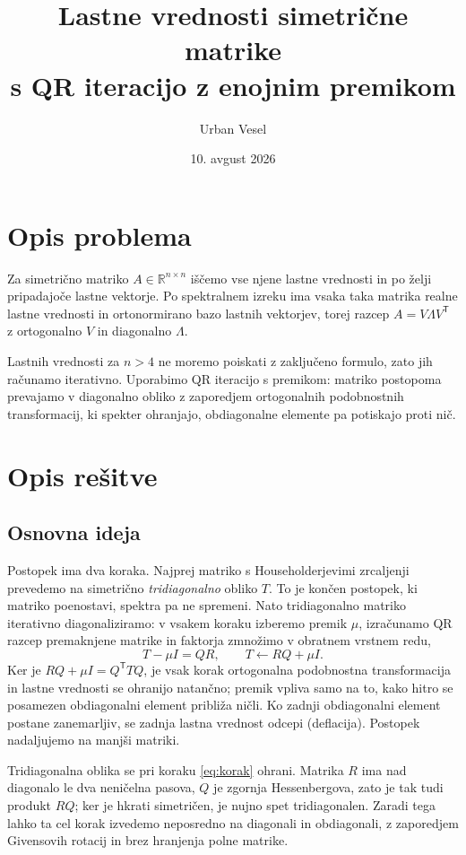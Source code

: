 \documentclass[11pt,a4paper]{article}
\title{Lastne vrednosti simetrične matrike\\ s QR iteracijo z enojnim premikom}
\author{Urban Vesel}
\date{10. avgust 2026}
\begin{document}
\maketitle
 
\section{Opis problema}
 
Za simetrično matriko $A \in \mathbb{R}^{n\times n}$ iščemo vse njene lastne
vrednosti in po želji pripadajoče lastne vektorje. Po spektralnem izreku ima
vsaka taka matrika realne lastne vrednosti in ortonormirano bazo lastnih
vektorjev, torej razcep $A = V\Lambda V^{\mathsf T}$ z ortogonalno $V$ in
diagonalno $\Lambda$.
 
Lastnih vrednosti za $n > 4$ ne moremo poiskati z zaključeno formulo, zato jih
računamo iterativno. Uporabimo QR iteracijo s premikom: matriko postopoma
prevajamo v diagonalno obliko z zaporedjem ortogonalnih podobnostnih
transformacij, ki spekter ohranjajo, obdiagonalne elemente pa potiskajo
proti nič.
 
\section{Opis rešitve}
 
\subsection{Osnovna ideja}
 
Postopek ima dva koraka. Najprej matriko s Householderjevimi zrcaljenji
prevedemo na simetrično \emph{tridiagonalno} obliko $T$. To je končen
postopek, ki matriko poenostavi, spektra pa ne spremeni. Nato tridiagonalno
matriko iterativno diagonaliziramo: v vsakem koraku izberemo premik $\mu$,
izračunamo QR razcep premaknjene matrike in faktorja zmnožimo v obratnem
vrstnem redu,
\begin{equation}
  T - \mu I = QR, \qquad T \leftarrow RQ + \mu I .
  \label{eq:korak}
\end{equation}
Ker je $RQ + \mu I = Q^{\mathsf T} T Q$, je vsak korak ortogonalna podobnostna
transformacija in lastne vrednosti se ohranijo natančno; premik vpliva samo na to,
kako hitro se posamezen obdiagonalni element približa ničli. Ko zadnji
obdiagonalni element postane zanemarljiv, se zadnja lastna vrednost odcepi
(deflacija). Postopek nadaljujemo na manjši matriki.
 
Tridiagonalna oblika se pri koraku \eqref{eq:korak} ohrani. Matrika $R$ ima nad
diagonalo le dva neničelna pasova, $Q$ je zgornja Hessenbergova, zato je tak
tudi produkt $RQ$; ker je hkrati simetričen, je nujno spet tridiagonalen. Zaradi
tega lahko ta cel korak izvedemo neposredno na diagonali in obdiagonali, z
zaporedjem Givensovih rotacij in brez hranjenja polne matrike.
 
\end{document}
